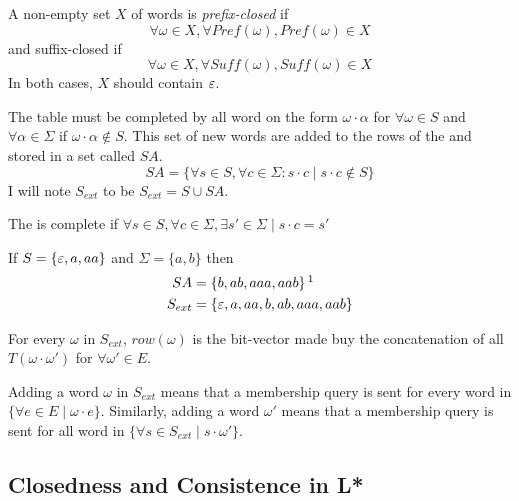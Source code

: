\begin{definition}
  A non-empty set $X$ of words is \textit{prefix-closed} if
  \[\forall \omega \in X, \forall Pref(\omega), Pref(\omega) \in X\]
  and suffix-closed if
  \[\forall \omega \in X, \forall Suff(\omega), Suff(\omega) \in X\]
  In both cases, $X$ should contain $\varepsilon$.
\end{definition}

The \OT table must be completed by all word on the form $\omega \cdot \alpha$ for $\forall \omega \in S$ and $\forall \alpha \in \Sigma$ if $\omega \cdot \alpha \notin S$. This set of new words are added to the rows of the \OT and stored in a set called $SA$.
\[SA = \{\forall s \in S, \forall c \in \Sigma: s \cdot c \mid s \cdot c \notin S \} \]
I will note $S_{ext}$ to be $S_{ext} = S \cup SA$.

\begin{definition}[Completeness]
  The \OT is complete if $\forall s \in S, \forall c \in \Sigma, \exists s' \in \Sigma \mid s \cdot c = s'$
\end{definition}

\begin{example}
  If $S = \{\varepsilon, a, aa\}$ and $\Sigma = \{a, b\}$ then
  \begin{align*}
    SA      & = \left\{ b, ab, aaa, aab \right\}\footnotemark{}
    \\
    S_{ext} & = \left\{\E, a, aa, b, ab, aaa, aab\right\}
  \end{align*}
\end{example}


\begin{notation}
  For every $\omega$ in $S_{ext}$, $row(\omega)$ is the bit-vector made buy the concatenation of all $T(\omega \cdot \omega')$ for $\forall \omega' \in E$.
\end{notation}

\begin{remark}
  Adding a word $\omega$ in $S_{ext}$ means that a membership query is sent for every word in $\{\forall e \in E \mid \omega \cdot e\}$. Similarly, adding a word $\omega'$ means that a membership query is sent for all word in $\{\forall s \in S_{ext} \mid s \cdot \omega'\}$.
\end{remark}

\subsection{Closedness and Consistence in L*}

